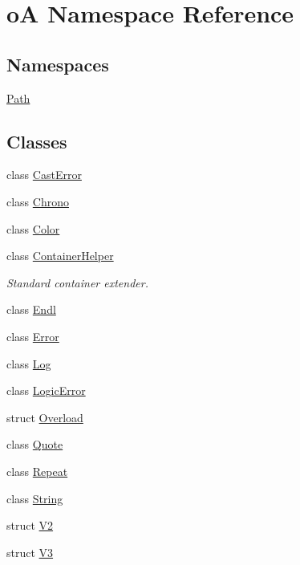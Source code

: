 \hypertarget{namespaceo_a}{}\section{oA Namespace Reference}
\label{namespaceo_a}
\subsection*{Namespaces}
\begin{DoxyCompactItemize}
\item 
 \mbox{\hyperlink{namespaceo_a_1_1_path}{Path}}
\end{DoxyCompactItemize}
\subsection*{Classes}
\begin{DoxyCompactItemize}
\item 
class \mbox{\hyperlink{classo_a_1_1_cast_error}{Cast\+Error}}
\item 
class \mbox{\hyperlink{classo_a_1_1_chrono}{Chrono}}
\item 
class \mbox{\hyperlink{classo_a_1_1_color}{Color}}
\item 
class \mbox{\hyperlink{classo_a_1_1_container_helper}{Container\+Helper}}
\begin{DoxyCompactList}\small\item\em Standard container extender. \end{DoxyCompactList}\item 
class \mbox{\hyperlink{classo_a_1_1_endl}{Endl}}
\item 
class \mbox{\hyperlink{classo_a_1_1_error}{Error}}
\item 
class \mbox{\hyperlink{classo_a_1_1_log}{Log}}
\item 
class \mbox{\hyperlink{classo_a_1_1_logic_error}{Logic\+Error}}
\item 
struct \mbox{\hyperlink{structo_a_1_1_overload}{Overload}}
\item 
class \mbox{\hyperlink{classo_a_1_1_quote}{Quote}}
\item 
class \mbox{\hyperlink{classo_a_1_1_repeat}{Repeat}}
\item 
class \mbox{\hyperlink{classo_a_1_1_string}{String}}
\item 
struct \mbox{\hyperlink{structo_a_1_1_v2}{V2}}
\item 
struct \mbox{\hyperlink{structo_a_1_1_v3}{V3}}
\end{DoxyCompactItemize}
